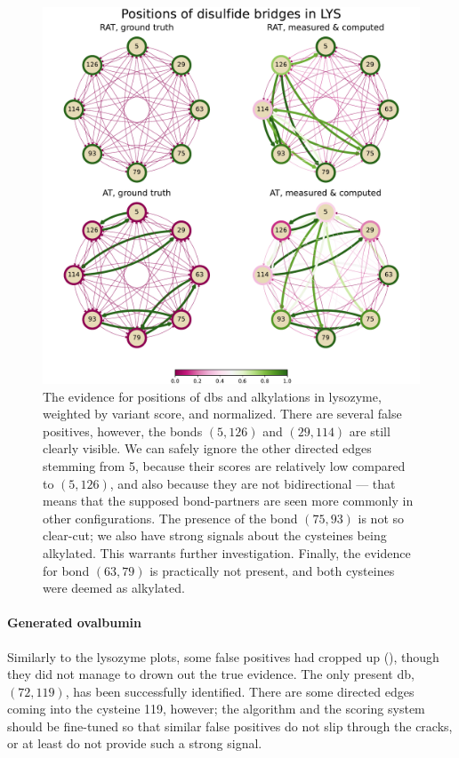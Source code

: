 \begin{figure}
  \centering
  \includegraphics[width=0.9\linewidth]{img/lys.pdf}
  \caption{The evidence for positions of \glspl*{db} and alkylations in lysozyme, weighted by variant score, and normalized. There are several false positives, however, the bonds \((5, 126)\) and \((29, 114)\) are still clearly visible. We can safely ignore the other directed edges stemming from 5, because their scores are relatively low compared to \((5, 126)\), and also because they are not bidirectional --- that means that the supposed bond-partners are seen more commonly in other configurations. The presence of the bond \((75, 93)\) is not so clear-cut; we also have strong signals about the cysteines being alkylated. This warrants further investigation. Finally, the evidence for bond \((63, 79)\) is practically not present, and both cysteines were deemed as alkylated.}\label{fig:lys}
\end{figure}

\paragraph{Generated ovalbumin} Similarly to the lysozyme plots, some false positives had cropped up (), though they did not manage to drown out the true evidence. The only present \gls*{db}, \((72, 119)\), has been successfully identified. There are some directed edges coming into the cysteine 119, however; the algorithm and the scoring system should be fine-tuned so that similar false positives do not slip through the cracks, or at least do not provide such a strong signal.

